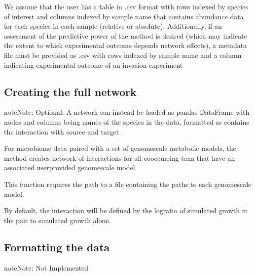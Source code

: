 \documentclass[letterpaper,10pt,english]{sphinxmanual}
\begin{document}
\sphinxAtStartPar
We assume that the user has a table in .csv format with rows indexed by species of interest and columns indexed by sample name that contains abundance data for each species in each sample (relative or absolute). Additionally, if an assessment of the predictive power of the method is desired (which may indicate
the extent to which experimental outcome depends network effects), a metadata file must be provided as .csv with rows indexed by sample name and a column indicating experimental outcome of an invasion experiment


\subsection{Creating the full network}
\label{\detokenize{usage:creating-the-full-network}}
\begin{sphinxadmonition}{note}{Note:}
\sphinxAtStartPar
Optional: A network can instead be loaded as pandas DataFrame with nodes and columns being names of the species in the data, formatted  as  contains the interaction with source  and target .
\end{sphinxadmonition}

\sphinxAtStartPar
For microbiome data paired with a set of genome\sphinxhyphen{}scale metabolic models, the method creates network of interactions for all co\sphinxhyphen{}occurring taxa that have an associated user\sphinxhyphen{}provided genome\sphinxhyphen{}scale model.

\begin{sphinxVerbatim}[commandchars=\\\{\}]
   

  
\end{sphinxVerbatim}

\sphinxAtStartPar
This function requires the path to a file containing the paths to each genome\sphinxhyphen{}scale model.

\sphinxAtStartPar
By default, the interaction will be defined by the log\sphinxhyphen{}ratio of simulated growth in the pair to simulated growth alone.


\subsection{Formatting the data}
\label{\detokenize{usage:formatting-the-data}}
\begin{sphinxadmonition}{note}{Note:}
\sphinxAtStartPar
Not Implemented
\end{sphinxadmonition}
\end{document}
